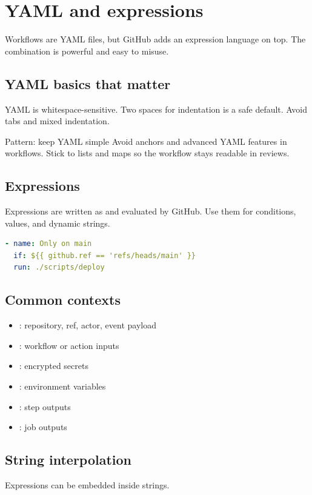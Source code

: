 \chapter{YAML and expressions}

Workflows are YAML files, but GitHub adds an expression language on top.
The combination is powerful and easy to misuse.

\section{YAML basics that matter}
YAML is whitespace-sensitive.
Two spaces for indentation is a safe default.
Avoid tabs and mixed indentation.

\begin{patternbox}{Pattern: keep YAML simple}
Avoid anchors and advanced YAML features in workflows.
Stick to lists and maps so the workflow stays readable in reviews.
\end{patternbox}

\section{Expressions}
Expressions are written as  and evaluated by GitHub.
Use them for conditions, values, and dynamic strings.

\begin{lstlisting}[language=YAML]
- name: Only on main
  if: ${{ github.ref == 'refs/heads/main' }}
  run: ./scripts/deploy
\end{lstlisting}

\section{Common contexts}
\begin{itemize}[nosep]
  \item {}: repository, ref, actor, event payload
  \item {}: workflow or action inputs
  \item {}: encrypted secrets
  \item {}: environment variables
  \item {}: step outputs
  \item {}: job outputs
\end{itemize}

\section{String interpolation}
Expressions can be embedded inside strings.

